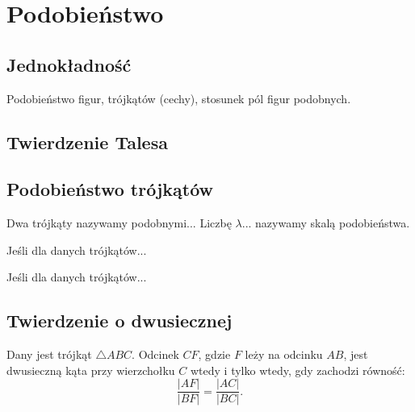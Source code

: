 %

\section{Podobieństwo}
\subsection{Jednokładność}
Podobieństwo figur, trójkątów (cechy), stosunek pól figur podobnych.

\subsection{Twierdzenie Talesa}


\subsection{Podobieństwo trójkątów}
\begin{definition}
	Dwa trójkąty nazywamy podobnymi...
	Liczbę $\lambda$... nazywamy skalą podobieństwa.
\end{definition}

\begin{proposition}
	Jeśli dla danych trójkątów...
\end{proposition}

\begin{proposition}
	Jeśli dla danych trójkątów...
\end{proposition}




\subsection{Twierdzenie o dwusiecznej}

\begin{proposition}
	Dany jest trójkąt $\triangle ABC$.
	Odcinek $CF$, gdzie $F$ leży na odcinku $AB$, jest dwusieczną kąta przy wierzchołku $C$ wtedy i tylko wtedy, gdy zachodzi równość:
	\begin{equation}
		\frac{|AF|}{|BF|} = \frac{|AC|}{|BC|}.
	\end{equation}
\end{proposition}

